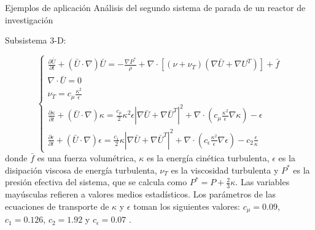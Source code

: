 \footnotesize
\begin{frame}
{Ejemplos de aplicación}
{Análisis del segundo sistema de parada de un reactor de investigación}

Subsistema 3-D:

\begin{equation}
\left\{ \begin{array}{l}
\displaystyle \frac{\partial \bar{U} }{\partial t} + ( \bar{U} \cdot \nabla) \bar{U} = - \frac {\nabla P^*}{\rho} + 
\nabla \cdot \left[ \left( \nu + \nu_T \right) \left( \nabla \bar{U} + \nabla U^T \right) \right] +\bar{f} \\
\nabla \cdot \bar{U} =0 \\
\displaystyle \nu_T = c_\mu \frac{\kappa^2}{\epsilon} \\
\displaystyle \frac{\partial \kappa}{\partial t} + ( \bar{U} \cdot \nabla) \kappa = \frac{c_\mu} {2}{\kappa^2}{\epsilon} \left | \nabla \bar{U} + \nabla\bar{U}^T \right | ^2  
+ \nabla \cdot \left( c_\mu \frac{\kappa^2}{\epsilon} \nabla \kappa \right) - \epsilon \\
\displaystyle \frac{\partial {\epsilon}}{\partial t} + ( \bar{U} \cdot \nabla) \epsilon = \frac{c_1} {2} \kappa \left | \nabla \bar{U} + \nabla \bar{U}^T \right | ^2
+ \nabla \cdot \left( c_{\epsilon} \frac{\kappa^2}{\epsilon} \nabla \epsilon \right) - c_2 \frac{\epsilon}{\kappa}
\label{eq-mani}
\end{array} \right.
\end{equation}
donde $\bar{f}$ es una fuerza volumétrica, 
$\kappa$ es la energía cinética turbulenta, $\epsilon$ es la disipación viscosa de energía turbulenta,
$\nu_T$ es la viscosidad turbulenta y $P^*$ es la presión efectiva del sistema, que se calcula como
$\displaystyle P^* = P + \frac {2}{3}\kappa$.
Las variables mayúsculas refieren a valores medios estadísticos.
Los parámetros de las ecuaciones de transporte de $\kappa$ y $\epsilon$ toman los siguientes valores:
$c_\mu=0.09$, $c_1=0.126$, $c_2=1.92$ y $c_\epsilon=0.07$ \cite{durbin}.

\end{frame}

